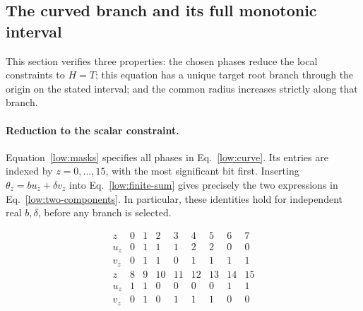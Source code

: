 \subsection{The curved branch and its full monotonic interval}
\label{low:app-curve}

This section verifies three properties: the chosen phases reduce the local constraints to $H=T$; this equation has a unique target root branch through the origin on the stated interval; and the common radius increases strictly along that branch.

\paragraph{Reduction to the scalar constraint.}
Equation~\eqref{low:masks} specifies all phases in Eq.~\eqref{low:curve}.
Its entries are indexed by $z=0,\ldots,15$, with the most significant
bit first.  Inserting $\theta_z=bu_z+\delta v_z$ into
Eq.~\eqref{low:finite-sum} gives precisely the two expressions
in Eq.~\eqref{low:two-components}.  In particular, these identities
hold for independent real $b,\delta$, before any branch is selected.

\begin{equation}
 \begin{array}{c|rrrrrrrr}
 z&0&1&2&3&4&5&6&7\\
 u_z&0&1&1&1&2&2&0&0\\
 v_z&0&1&1&0&1&1&1&1\\[2pt]
 z&8&9&10&11&12&13&14&15\\
 u_z&1&1&0&0&0&0&1&1\\
 v_z&0&1&0&1&1&1&0&0
 \end{array}
 \label{low:masks}
\end{equation}

